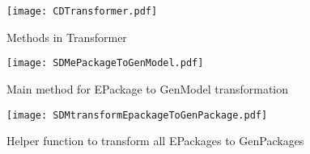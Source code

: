 \begin{figure}[htbp]
\begin{center}  
\texttt{[image: CDTransformer.pdf]}
\caption{Methods in \textsf{Transformer}}  
\label{fig_e2gm}
\end{center}
\end{figure} 

\begin{figure}[htbp]
\begin{center}  \texttt{[image: SDMePackageToGenModel.pdf]}
        \caption{Main method for \textsf{EPackage} to \textsf{GenModel} transformation}  
  \label{fig_pack2gm}
\end{center}
\end{figure} 

\begin{figure}[htbp]
\begin{center}  
\texttt{[image: SDMtransformEpackageToGenPackage.pdf]}
\caption{Helper function to transform all \textsf{EPackages} to \textsf{GenPackages}}  
\label{fig_transf}
\end{center}
\end{figure} 

